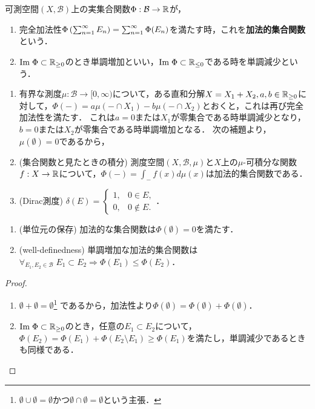 \documentclass[uplatex, dvipdfmx]{jsreport}
\renewcommand{\B}{\mathcal{B}}
\begin{document}
\begin{definition}
    可測空間$(X,\B)$上の実集合関数$\Phi:\B\to\R$が，
    \begin{enumerate}
        \item 完全加法性$\Phi\left(\sum^\infty_{n=1}E_n\right)=\sum^\infty_{n=1}\Phi(E_n)$を満たす時，これを\textbf{加法的集合関数}という．
        \item $\mathrm{Im}\;\Phi\subset\mathbb{R}_{\ge 0}$のとき単調増加といい，$\mathrm{Im}\;\Phi\subset\mathbb{R}_{\le 0}$である時を単調減少という．
    \end{enumerate}
\end{definition}

\begin{example}[加法的集合関数の表現]\mbox{}\label{exp-representation-of-additive-set-function}
    \begin{enumerate}
        \item 有界な測度$\mu:\B\to[0,\infty)$について，ある直和分解$X=X_1+X_2,a,b\in\mathbb{R}_{\ge 0}$に対して，$\Phi(-)=a\mu(-\cap X_1)-b\mu(-\cap X_2)$とおくと，これは再び完全加法性を満たす．
        これは$a=0$または$X_1$が零集合である時単調減少となり，$b=0$または$X_2$が零集合である時単調増加となる．
        次の補題より，$\mu(\emptyset)=0$であるから，
        \item (集合関数と見たときの積分) 測度空間$(X,\B,\mu)$と$X$上の$\mu$-可積分な関数$f:X\to\mathbb{R}$について，$\Phi(-)=\int_{-}f(x)d\mu(x)$は加法的集合関数である．
        \item (Dirac測度) $\delta(E)=\begin{cases}1,&0\in E,\\0,&0\notin E.\end{cases}$．
    \end{enumerate}
\end{example}

\begin{lemma}\mbox{}\label{lemma-additive-set-function}
    \begin{enumerate}
        \item (単位元の保存) 加法的な集合関数は$\Phi(\emptyset)=0$を満たす．
        \item (well-definedness) 単調増加な加法的集合関数は$\forall_{E_1,E_2\in\B}\;E_1\subset E_2\Rightarrow\Phi(E_1)\le\Phi(E_2)$．
    \end{enumerate}
\end{lemma}
\begin{proof}\mbox{}
    \begin{enumerate}
        \item $\emptyset+\emptyset=\emptyset$\footnote{$\emptyset\cup\emptyset=\emptyset$かつ$\emptyset\cap\emptyset=\emptyset$という主張．}
        であるから，加法性より$\Phi(\emptyset)=\Phi(\emptyset)+\Phi(\emptyset)$．
        \item $\mathrm{Im}\;\Phi\subset\mathbb{R}_{\ge 0}$のとき，任意の$E_1\subset E_2$について，$\Phi(E_2)=\Phi(E_1)+\Phi(E_2\setminus E_1)\ge\Phi(E_1)$を満たし，単調減少であるときも同様である．
    \end{enumerate}
\end{proof}
\end{document}
